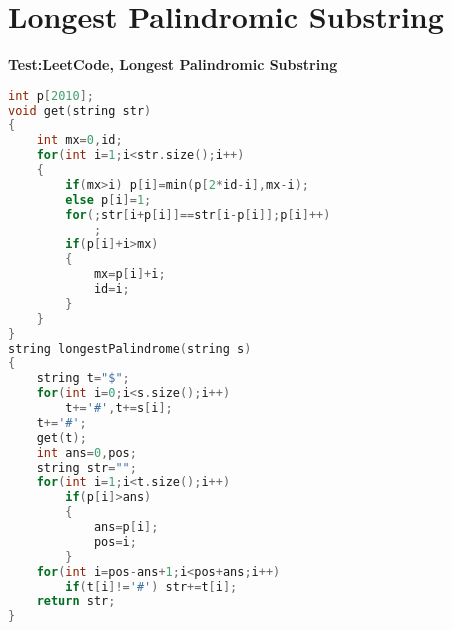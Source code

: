  \section{Longest Palindromic Substring}
 \textbf{Test:LeetCode, Longest Palindromic Substring}
 \begin{lstlisting}[language=C++]
int p[2010];
void get(string str)
{
	int mx=0,id;
	for(int i=1;i<str.size();i++)
	{
		if(mx>i) p[i]=min(p[2*id-i],mx-i);
		else p[i]=1;
		for(;str[i+p[i]]==str[i-p[i]];p[i]++)
			;
		if(p[i]+i>mx)
		{
			mx=p[i]+i;
			id=i;
		}
	}
}
string longestPalindrome(string s) 
{
	string t="$";
	for(int i=0;i<s.size();i++)
		t+='#',t+=s[i];
	t+='#';
	get(t);
	int ans=0,pos;
	string str="";
	for(int i=1;i<t.size();i++)
		if(p[i]>ans)
		{
			ans=p[i];
			pos=i;
		}
	for(int i=pos-ans+1;i<pos+ans;i++)
		if(t[i]!='#') str+=t[i];
	return str;
}
 \end{lstlisting}



















\endinput